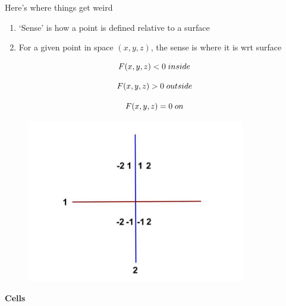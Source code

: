 \documentclass[aspectratio=1610,pdftex,dvipsnames,compress,xcolor={dvipsnames}]{beamer}
\begin{document}
\addtocounter{framenumber}{-1} 
\begin{frame}{Here's where things get weird}
    \begin{enumerate}[series=outerlist,topsep=0pt,itemsep=21pt,leftmargin=*,label=(\arabic*)]
        \item[]`Sense' is how a point is defined relative to a surface
        \item[]For a given point in space $(x,y,z)$, the sense is where it is wrt surface
    \end{enumerate}

    \vspace*{\fill}

    \begin{equation}
        \LARGE
        F(x,y,z) < 0 \; inside
    \end{equation}

    \begin{equation}
        \LARGE
        F(x,y,z) > 0 \; outside
    \end{equation}

    \begin{equation}
        \LARGE
        F(x,y,z) = 0 \; on
    \end{equation}
\end{frame}


\begin{frame}{}
    \begin{figure}
        \centering
        \includegraphics[width=0.85\textwidth]{mcnp_basic.surface.jpg}
    \end{figure}
\end{frame}


\begin{frame}[plain]{}
    \centering\LARGE\textbf{Cells}
\end{frame}
\end{document}
